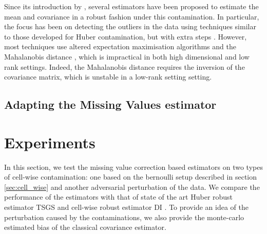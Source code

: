 \documentclass{article}
\numberwithin{equation}{section}
\numberwithin{equation}{section}
\begin{document}
    Since its introduction by \cite{alqallafPropagationOutliersMultivariate2009}, several estimators have been proposed to estimate the mean and covariance in a robust fashion under this contamination. In particular, the focus has been on detecting the outliers in the data using techniques similar to those developed for Huber contamination, but with extra steps \citep{farcomeniRobustConstrainedClustering2014, rousseeuwDetectingDeviatingData2018}. However, most techniques use altered expectation maximisation algorithms and the Mahalanobis distance \cite{raymaekersHandlingCellwiseOutliers2020}, which is impractical in both high dimensional and low rank settings. Indeed, the Mahalanobis distance requires the inversion of the covariance matrix, which is unstable in a low-rank setting setting.
    

    

    
    

    \subsection{Adapting the Missing Values estimator}


    
\section{Experiments}
\label{sec:empirical}

    In this section, we test the missing value correction based estimators on two types of cell-wise contamination: one based on the bernoulli setup described in section \ref{sec:cell_wise} and another adversarial perturbation of the data. We compare the performance of the estimators with that of state of the art Huber robust estimator TSGS \citep{agostinelliRobustEstimationMultivariate2014} and cell-wise robust estimator DI \citep{raymaekersHandlingCellwiseOutliers2020}. To provide an idea of the perturbation caused by the contaminations, we also provide the monte-carlo estimated bias of the classical covariance estimator.
    
\end{document}
